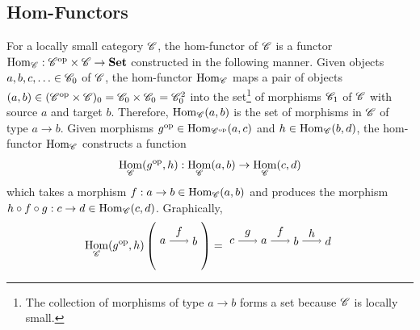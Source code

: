 \documentclass[10pt]{article}
\theoremstyle{definition}
\theoremstyle{remark}
\newcommand{\opcat}{\mathrm{op}}
\DeclareMathOperator{\Hom}{Hom}
\begin{document}
\subsection{Hom-Functors}
For a locally small category $\mathscr{C}$, the hom-functor of $\mathscr{C}$ is a functor $\Hom_{\catC} : \catC^{\opcat} \times \catC \to \mathbf{Set}$ constructed in the following manner. Given objects $a,b,c,\ldots \in \mathscr{C}_0$ of $\mathscr{C}$, the hom-functor $\Hom_{\catC}$ maps a pair of objects $(a,b) \in (\catC^\opcat \times \catC)_0 = \catC_0 \times \catC_0 = \catC_0^2$ into the set\footnote{The collection of morphisms of type $a \to b$ forms a set because $\mathscr{C}$ is locally small.} of morphisms $\mathscr{C}_1$ of $\mathscr{C}$ with source $a$ and target $b$. Therefore, $\Hom_{\catC}(a,b)$ is the set of morphisms in $\mathscr{C}$ of type $a \to b$. Given morphisms $g^{\opcat} \in \Hom_{\catC^{\opcat}}(a,c)$ and $h \in \Hom_{\catC}(b,d)$, the hom-functor $\Hom_{\catC}$ constructs a function
\[ \Hom_{\catC}(g^{\opcat}, h) : \Hom_{\catC}(a,b) \to \Hom_{\catC}(c,d) \]
which takes a morphism $f : a \to b \in \Hom_{\catC}(a,b)$ and produces the morphism $h \circ f \circ g : c \to d \in \Hom_{\catC}(c,d)$. Graphically,
\[
    \Hom_{\catC}(g^{\opcat}, h)
    \left(
    \begin{tikzpicture}
        \draw (0,0) node(a){$a$};
        \draw (1,0) node(b){$b$};
        \draw[->] (a) to node[above, midway]{$f$} (b);
    \end{tikzpicture}
    \right)
    =
    \begin{tikzpicture}
        \draw (0,0) node(c){$c$};
        \draw (1,0) node(a){$a$};
        \draw (2,0) node(b){$b$};
        \draw (3,0) node(d){$d$};
        \draw[->] (c) to node[above, midway]{$g$} (a);
        \draw[->] (a) to node[above, midway]{$f$} (b);
        \draw[->] (b) to node[above, midway]{$h$} (d);
    \end{tikzpicture}
\]
\end{document}
